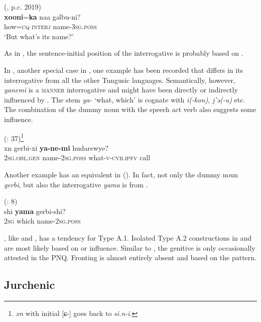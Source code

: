 \documentclass[output=paper,colorlinks,citecolor=brown]{langscibook}
\begin{document}
\ea
    \label{example4.104}
     (, p.c. 2019)\\
    \gll \textbf{xooni}=\textbf{ka}	naa			gəlbu-ni?\\
    how=\textsc{cq}		\textsc{interj}		name-3\textsc{sg.poss}\\
    \glt ‘But what’s its name?’
    \z

\noindent As in , the sentence-initial position of the interrogative is probably based on .

In , another special case in , one example has been recorded that differs in its interrogative from all the other Tungusic languages. Semantically, however, \textit{yanemi} is a \textsc{manner} interrogative and might have been directly or indirectly influenced by . The stem \textit{ya-} ‘what, which’ is cognate with  \textit{i(-kon)},  \textit{j’ə(-u)} etc. The combination of the dummy noun with the speech act verb also suggests some  influence.

\ea
    \label{example4.105}
     (\citealt{Dong2016}: 37)\footnote{\textit{xn} with initial [ɕ-] goes back to \textit{si.n-i}.}\\
    \gll xn			gerbi-xi			\textbf{ya-ne-mi}		hudarewye?\\
    2\textsc{sg.obl.gen}	name-2\textsc{sg.poss}		what-\textsc{v-cvb.ipfv}	call\\
    \z

\noindent Another  example has an equivalent in  (). In fact, not only the dummy noun \textit{gerbi}, but also the interrogative \textit{yama} is from .

\ea
    \label{example4.106}
     (\citealt{Chaoke2014b}: 8)\\
    \gll shi		\textbf{yama}	gerbi-shi?\\
    2\textsc{sg}		which	name-2\textsc{sg.poss}\\
    \z

, like  and , has a tendency for Type A.1. Isolated Type A.2 constructions in  and  are most likely based on  or  influence. Similar to , the genitive is only occasionally attested in the PNQ. Fronting is almost entirely absent and based on the  pattern.


\subsection{Jurchenic}\label{section4.4.6}
\end{document}
